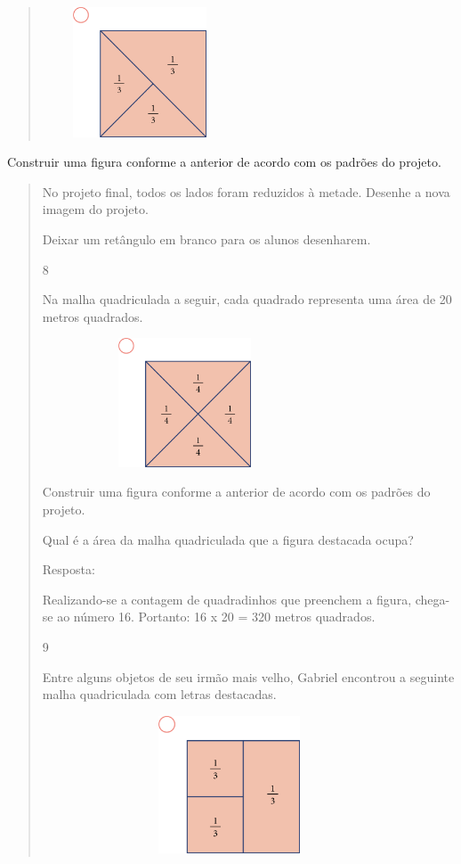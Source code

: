 \begin{mdframed}[linewidth=2pt,linecolor=salmao,roundcorner=2pt]
\begin{itemize}
{\begin{itemize}
\begin{escolha}
{\begin{quote}
\includegraphics[width=2.27520in,height=1.51680in]{media/image66.png}
\end{quote}

Construir uma figura conforme a anterior de acordo com os padrões do
projeto.

\begin{quote}
No projeto final, todos os lados foram reduzidos à metade. Desenhe
a nova imagem do projeto.

\Paulo Deixar um retângulo em branco para os alunos desenharem.

\num{8}

Na malha quadriculada a seguir, cada quadrado representa uma área de 20
metros quadrados.

\includegraphics[width=3.33333in,height=1.50517in]{media/image68.png}

Construir uma figura conforme a anterior de acordo com os padrões do
projeto.

Qual é a área da malha quadriculada que a figura destacada ocupa?

Resposta:

Realizando-se a contagem de quadradinhos que preenchem a figura, chega-se
ao número 16. Portanto: 16 x 20 = 320 metros quadrados.

\num{9}

Entre alguns objetos de seu irmão mais velho, Gabriel encontrou a seguinte
malha quadriculada com letras destacadas.

\includegraphics[width=4.36538in,height=1.60417in]{media/image69.png}


\end{quote}}
\end{escolha}
\end{itemize}}
\end{itemize}
\end{mdframed}
